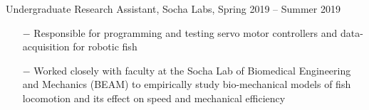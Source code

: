 \documentclass{article}
\begin{document}
{{\selectfont Undergraduate Research Assistant, Socha Labs, Spring 2019 – Summer 2019}
\vspace{-5pt}
\begin{itemize}
	\setlength{\leftskip}{15pt}
	\setlength\itemsep{-0.5em}
	\item[$-$] Responsible for programming and testing servo motor controllers and data-acquisition for robotic fish
	\item[$-$] Worked closely with faculty at the Socha Lab of Biomedical Engineering and Mechanics (BEAM) to empirically study bio-mechanical models of fish locomotion and its effect on speed and mechanical efficiency
\end{itemize}



% 
% 
% 

}
\end{document}
